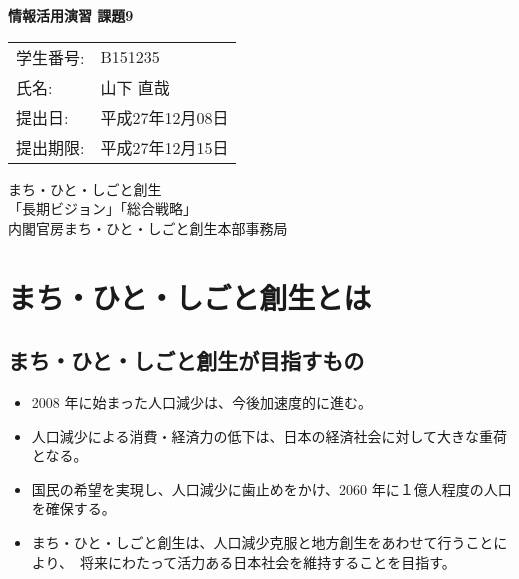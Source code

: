 \topmargin=-1.5cm
\textwidth=17cm
\textheight=25cm
\oddsidemargin=-0.5cm
\evensidemargin=-0.5cm


\begin{center}
  \Large\bf 情報活用演習 課題9
\end{center}

\begin{flushright}
  \begin{tabular}{ll}
    学生番号: & B151235 \\
    氏名:     & 山下 直哉 \\
    提出日:   & 平成27年12月08日 \\
    提出期限: & 平成27年12月15日 \\
  \end{tabular}
\end{flushright}

\begin {center}
  まち・ひと・しごと創生 \\
  「長期ビジョン」「総合戦略」 \\
  内閣官房まち・ひと・しごと創生本部事務局 \\
\end {center}

\section {まち・ひと・しごと創生とは}
\subsection {まち・ひと・しごと創生が目指すもの}
\begin {itemize}
\item 2008 年に始まった人口減少は、今後加速度的に進む。\par
\item 人口減少による消費・経済力の低下は、日本の経済社会に対して大きな重荷となる。\par
\item 国民の希望を実現し、人口減少に歯止めをかけ、2060 年に１億人程度の人口を確保する。\par
\item まち・ひと・しごと創生は、人口減少克服と地方創生をあわせて行うことにより、　将来にわたって活力ある日本社会を維持することを目指す。\par

  \begin{figure}[htb]
    \begin{center}
    \end{center}
  \end{figure}

\end {itemize}

